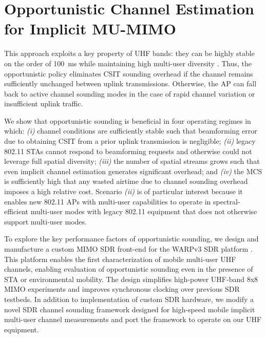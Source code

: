 % 
\section{Opportunistic Channel Estimation for Implicit MU-MIMO}
\label{sec_opportunistic}

This approach exploits a key property of UHF bands: they can be highly stable on the order of 100~ms while maintaining high multi-user diversity \cite{anand2014case}.
Thus, the opportunistic policy eliminates \ac{CSIT} sounding overhead if the channel remains
sufficiently unchanged between uplink transmissions.
Otherwise, the AP can fall back to active channel sounding modes in the case of rapid channel variation or insufficient uplink traffic.  
	
We show that opportunistic sounding is beneficial in four operating regimes in which: \emph{(i)} channel conditions are sufficiently stable such that beamforming error due to obtaining \ac{CSIT} from a prior uplink transmission is negligible; \emph{(ii)} legacy 802.11 \acp{STA} cannot respond to beamforming requests and otherwise could not leverage full spatial diversity; \emph{(iii)} the number of spatial streams grows such that even implicit channel estimation generates significant overhead; and \emph{(iv)} the \ac{MCS} is sufficiently high that any wasted airtime due to channel sounding overhead imposes a high relative cost.
Scenario \textit{(ii)} is of particular interest because it enables new 802.11 \acp{AP} with multi-user capabilities to operate in spectral-efficient multi-user modes with legacy 802.11 equipment that does not otherwise support multi-user modes.

To explore the key performance factors of opportunistic sounding, we design and manufacture a custom MIMO \ac{SDR} front-end for the WARPv3 \ac{SDR} platform \cite{warpProject}.
This platform enables the first characterization of mobile multi-user UHF channels, enabling
evaluation of opportunistic sounding even in the presence of \ac{STA} or environmental mobility.
The design simplifies high-power UHF-band 8x8 MIMO experiments and improves synchronous clocking over previous \ac{SDR} testbeds.
In addition to implementation of custom \ac{SDR} hardware, we modify a novel \ac{SDR} channel sounding framework designed for high-speed mobile implicit multi-user channel measurements \cite{shepard2015faros} and port the framework to operate on our UHF equipment.
	

